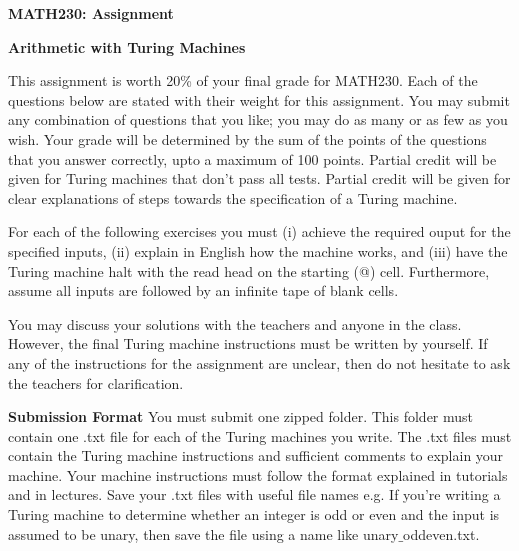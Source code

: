\documentclass[11pt]{report}
\begin{document}
	
	
\begin{center}
	{\bf MATH230: Assignment }
\end{center}
\begin{center}
	{\bf Arithmetic with Turing Machines}
\end{center}

This assignment is worth 20\% of your final grade for MATH230. Each of the questions below are stated with their weight for this assignment. You may submit any combination of questions that you like; you may do as many or as few as you wish. Your grade will be determined by the sum of the points of the questions that you answer correctly, upto a maximum of 100 points. Partial credit will be given for Turing machines that don't pass all tests. Partial credit will be given for clear explanations of steps towards the specification of a Turing machine. 

\vspace{0.5cm}

For each of the following exercises you must (i) achieve the required ouput for the specified inputs, (ii) explain in English how the machine works, and (iii) have the Turing machine halt with the read head on the starting (@) cell. Furthermore, assume all inputs are followed by an infinite tape of blank cells. 

\vspace{0.5cm}

You may discuss your solutions with the teachers and anyone in the class. However, the final Turing machine instructions must be written by yourself. If any of the instructions for the assignment are unclear, then do not hesitate to ask the teachers for clarification. 

\vspace{0.5cm}

{\bf Submission Format} You must submit one zipped folder. This folder must contain one .txt file for each of the Turing machines you write. The .txt files must contain the Turing machine instructions and sufficient comments to explain your machine. Your machine instructions must follow the format explained in tutorials and in lectures. Save your .txt files with useful file names e.g. If you're writing a Turing machine to determine whether an integer is odd or even and the input is assumed to be unary, then save the file using a name like  unary$\_$oddeven.txt.

\vspace{0.5cm}
\end{document}
